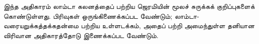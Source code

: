 \documentclass[../../../include/open-logic-chapter]{subfiles}
\begin{document}

\begin{editorial}
இந்த அதிகாரம் லாம்டா கலனத்தைப் பற்றிய ஜெரமியின் மூலச் சுருக்கக் குறிப்புகளைக்
கொண்டுள்ளது. பிரிவுகள் ஒருங்கிணைக்கப்பட வேண்டும்; லாம்டா-வரையறுக்கத்தக்கதன்மை
பற்றிய உள்ளடக்கம், அதைப் பற்றி அமைந்துள்ள தனியான விரிவான அதிகாரத்தோடு
இணைக்கப்பட வேண்டும்.
\end{editorial}














\OLEndChapterHook
\end{document}
